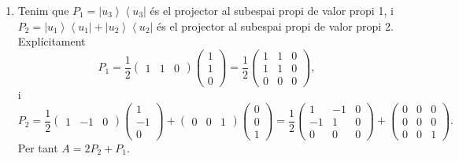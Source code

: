 \documentclass[12pt]{article}
\numberwithin{table}{section}
\numberwithin{figure}{section}
\numberwithin{equation}{section}
\newcommand{\ket}[1]{\left\lvert #1 \right\rangle}
\newcommand{\bra}[1]{\left\langle #1 \right\rvert}
\begin{document}
\begin{enumerate}[label=(\alph*), font=\bfseries \sffamily, wide, labelwidth=!, labelindent=0pt]
	\item Tenim que \( P_1 = \ket{u_3}\bra{u_3} \) és el projector al subespai propi de valor propi 1, i \( P_2 =  \ket{u_1}\bra{u_1} + \ket{u_2}\bra{u_2} \) és el projector al subespai propi de valor propi 2. Explícitament
		\begin{equation*}
			P_1 = \frac{1}{2}\begin{pmatrix}
				1 & 1 & 0
				\end{pmatrix} \begin{pmatrix}
				1\\1\\0
				\end{pmatrix} = \frac{1}{2}\begin{pmatrix}
				1 & 1 & 0\\
				1 & 1 & 0\\
				0 & 0 & 0
			\end{pmatrix},
		\end{equation*}
		i
		\begin{equation*}
			P_2 = \frac{1}{2}\begin{pmatrix}
				1 & -1 & 0
				\end{pmatrix} \begin{pmatrix}
				1\\-1\\0
				\end{pmatrix} + \begin{pmatrix}
				0 & 0 & 1	
				\end{pmatrix} \begin{pmatrix}
				0\\0\\1
				\end{pmatrix} = \frac{1}{2}\begin{pmatrix}
				1 & -1 & 0\\
				-1 & 1 & 0\\
				0 & 0 & 0
				\end{pmatrix} + \begin{pmatrix}
				0 & 0 & 0 \\
				0 & 0 & 0 \\
				0 & 0 & 1
			\end{pmatrix}.
		\end{equation*}
Per tant \( A = 2P_2 + P_1 \).


\end{enumerate}
\end{document}
